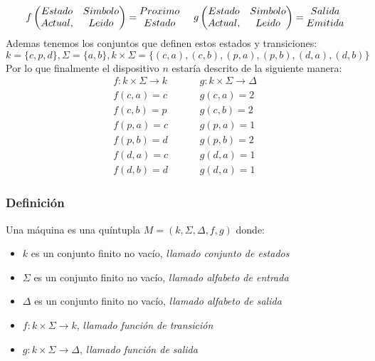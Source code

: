 \begin{equation*}
f \left( 
\begin{matrix}
    Estado & Simbolo\\ 
    Actual, &Leido 
\end{matrix}
 \right) = \begin{matrix}
    Proximo\\ 
    Estado
\end{matrix}
\hspace{0.5cm}
g \left( 
\begin{matrix}
    Estado & Simbolo\\ 
    Actual, &Leido 
\end{matrix}
 \right) = \begin{matrix}
    Salida\\ 
    Emitida
\end{matrix}
\end{equation*}
Ademas tenemos los conjuntos que definen estos estados y transiciones: \\
$$k=\{c,p,d\},\Sigma = \{ a,b \} ,k\times\Sigma = \{ (c,a),(c,b),(p,a),(p,b),(d,a),(d,b) \} $$
Por lo que finalmente el dispositivo $n$ estaría descrito de la siguiente manera:
\begin{align*}
f:k\times\Sigma\rightarrow k  \hspace{1cm} & g:k\times\Sigma\rightarrow \Delta \\
f(c,a) = c \hspace{1cm}  & g(c,a) = 2 \\
f(c,b) = p \hspace{1cm}  & g(c,b) = 2 \\
f(p,a) = c \hspace{1cm}  & g(p,a) = 1 \\
f(p,b) = d \hspace{1cm}  & g(p,b) = 2 \\
f(d,a) = c \hspace{1cm}  & g(d,a) = 1 \\
f(d,b) = d \hspace{1cm}  & g(d,a) = 1 
\end{align*}
\subsubsection{Definición}
Una máquina es una quíntupla $M=(k,\Sigma,\Delta,f,g)$ donde:
\begin{itemize}
\item $k$ es un conjunto finito no vacío, \textit{llamado conjunto de estados}
\item $\Sigma$ es un conjunto finito no vacío, \textit{llamado alfabeto de entrada}
\item $\Delta$ es un conjunto finito no vacío, \textit{llamado alfabeto de salida}
\item $f:k\times\Sigma\rightarrow k$, \textit{llamado función de transición}
\item $g:k\times\Sigma\rightarrow \Delta$, \textit{llamado función de salida}
\end{itemize}
